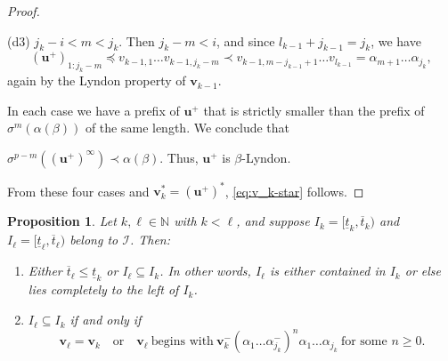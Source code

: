 \documentclass[11pt]{amsart}
\newtheorem{proposition}[theorem]{Proposition}
\theoremstyle{definition}
\theoremstyle{remark}
\numberwithin{equation}{section}
\newcommand{\N}{\ensuremath{\mathbb{N}}}
\newcommand{\II}{\mathcal{I}}
\renewcommand{\u}{\mathbf{u}}
\renewcommand{\v}{\mathbf{v}}
\newcommand{\f}{\infty}
\newcommand{\al}{\alpha}
\newcommand{\lle}{\preccurlyeq}
\newcommand{\si}{\sigma}
\begin{document}
\begin{proof}
\begin{enumerate}[(a)]
{(d3) $j_k-i<m<j_k$. Then $j_k-m<i$, and since $l_{k-1}+j_{k-1}=j_k$, we have
\[
(\u^+)_{1:j_k-m}\lle v_{k-1,1}\dots v_{k-1,j_k-m}\prec v_{k-1,m-j_{k-1}+1}\dots v_{l_{k-1}}=\al_{m+1}\dots\al_{j_k},
\]
again by the Lyndon property of $\v_{k-1}$.

In each case we have a prefix of $\u^+$ that is strictly smaller than the prefix of $\sigma^m(\al(\beta))$ of the same length. We conclude that} $\si^{p-m}((\u^+)^\f)\prec\al(\beta)$. Thus, $\u^+$ is $\beta$-Lyndon.
\end{enumerate}
From these four cases and $\v_k^*=(\u^+)^*$, \eqref{eq:v_k-star} follows.
\end{proof}

\begin{proposition} \label{prop:non-transitivity-intervals}
Let $k,\ell\in\N$ with $k<\ell$, and suppose $I_k=[\underline{t}_k,\overline{t}_k)$ and $I_\ell=[\underline{t}_\ell,\overline{t}_\ell)$ belong to $\II$. Then:
\begin{enumerate}[{\rm(i)}]
\item Either $\overline{t}_{\ell}\leq\underline{t}_k$ or $I_{\ell}\subseteq I_k$. In other words, $I_\ell$ is either contained in $I_k$ or else lies completely to the left of $I_k$.
\item $I_{\ell}\subseteq I_k$ if and only if
\begin{equation} \label{eq:containment-condition}
\v_{\ell}=\v_k\quad\mbox{or}\quad \v_{\ell}\ \mbox{begins with}\ \v_k^-(\al_1\dots\al_{j_k}^-)^n\al_1\dots\al_{j_k}\ \mbox{for some $n\geq 0$}.
\end{equation}
\end{enumerate}
\end{proposition}
\end{document}
